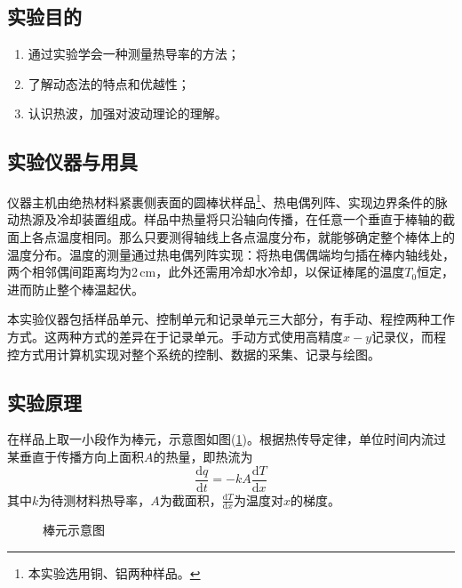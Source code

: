\documentclass[UTF8]{article}
\theoremstyle{MyLineTheoremStyle} %
\theoremstyle{MyBlockTheoremStyle} %
\theoremstyle{MySubsubsectionStyle} %
\begin{document}
\subsection{实验目的}
\begin{enumerate}
\item 通过实验学会一种测量热导率的方法；
\item 了解动态法的特点和优越性；
\item 认识热波，加强对波动理论的理解。
\end{enumerate}


\subsection{实验仪器与用具}
仪器主机由绝热材料紧裹侧表面的圆棒状样品\footnote{本实验选用铜、铝两种样品。}、热电偶列阵、实现边界条件的脉动热源及冷却装置组成。样品中热量将只沿轴向传播，在任意一个垂直于棒轴的截面上各点温度相同。那么只要测得轴线上各点温度分布，就能够确定整个棒体上的温度分布。温度的测量通过热电偶列阵实现：将热电偶偶端均匀插在棒内轴线处，两个相邻偶间距离均为2\,cm，此外还需用冷却水冷却，以保证棒尾的温度$ T_0 $恒定，进而防止整个棒温起伏。

本实验仪器包括样品单元、控制单元和记录单元三大部分，有手动、程控两种工作方式。这两种方式的差异在于记录单元。手动方式使用高精度$ x-y $记录仪，而程控方式用计算机实现对整个系统的控制、数据的采集、记录与绘图。

\subsection{实验原理}
在样品上取一小段作为棒元，示意图如图(\ref{difx})。根据热传导定律，单位时间内流过某垂直于传播方向上面积$ A $的热量，即热流为
\begin{equation}
\frac{\mathrm{d} q}{\mathrm{d} t}=-kA\frac{\mathrm{d} T}{\mathrm{d} x}
\end{equation}
其中$ k $为待测材料热导率，$ A $为截面积，$ \frac{\mathrm{d} T}{\mathrm{d} x} $为温度对$ x $的梯度。

\begin{figure}[!h]
    \centering
    \caption{棒元示意图}
    \label{difx}
\end{figure}
\end{document}
